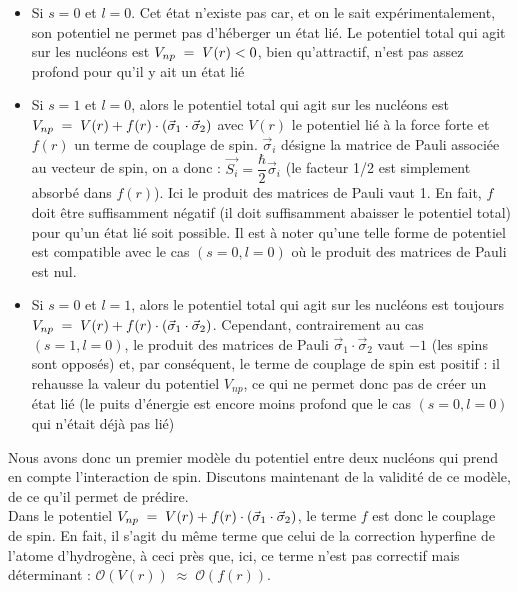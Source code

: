 \begin{itemize}[label=$\bullet$]

    \item Si $s=0$ et $l=0$. Cet état n'existe pas car, et on le sait expérimentalement, son potentiel ne permet pas d'héberger un état lié. Le potentiel total qui agit sur les nucléons est $V_{np} \; = \; V(r)<0$, bien qu'attractif, n'est pas assez profond pour qu'il y ait un état lié\\[4pt]
    
    \item Si $s=1$ et $l=0$, alors le potentiel total qui agit sur les nucléons est $V_{np} \; = \; V(r) + f(r) \cdot (\vec{\sigma}_1 \cdot \vec{\sigma}_2)$ avec $V(r)$ le potentiel lié à la force forte et $f(r)$ un terme de couplage de spin. $\vec{\sigma}_i$ désigne la matrice de Pauli associée au vecteur de spin, on a donc : $\vec{S_i} = \dfrac{\hbar}{2}\vec{\sigma}_i$ (le facteur 1/2 est simplement absorbé dans $f(r)$). Ici le produit des matrices de Pauli vaut 1.  En fait, $f$ doit être suffisamment négatif (il doit suffisamment abaisser le potentiel total) pour qu'un état lié soit possible. Il est à noter qu'une telle forme de potentiel est compatible avec le cas $(s=0,l=0)$ où le produit des matrices de Pauli est nul.\\[4pt]
    
    \item  Si $s=0$ et $l=1$, alors le potentiel total qui agit sur les nucléons est toujours $V_{np} \; = \; V(r) + f(r) \cdot (\vec{\sigma}_1 \cdot \vec{\sigma}_2)$. Cependant, contrairement au cas $(s=1,l=0)$, le produit des matrices de Pauli $\vec{\sigma}_1 \cdot \vec{\sigma}_2$ vaut $-1$ (les spins sont opposés) et, par conséquent, le terme de couplage de spin est positif : il rehausse la valeur du potentiel $V_{np}$, ce qui ne permet donc pas de créer un état lié (le puits d'énergie est encore moins profond que le cas $(s=0,l=0)$ qui n'était déjà pas lié)\\[4pt] 
    
\end{itemize}

Nous avons donc un premier modèle du potentiel entre deux nucléons qui prend en compte l'interaction de spin. Discutons maintenant de la validité de ce modèle, de ce qu'il permet de prédire.\\

Dans le potentiel $V_{np} \; = \; V(r) + f(r) \cdot (\vec{\sigma}_1 \cdot \vec{\sigma}_2)$, le terme $f$ est donc le couplage de spin. En fait, il s'agit du même terme que celui de la correction hyperfine de l'atome d'hydrogène, à ceci près que, ici, ce terme n'est pas correctif mais déterminant : $\mathcal{O}(V(r)) \;\approx\; \mathcal{O}(f(r))$.


